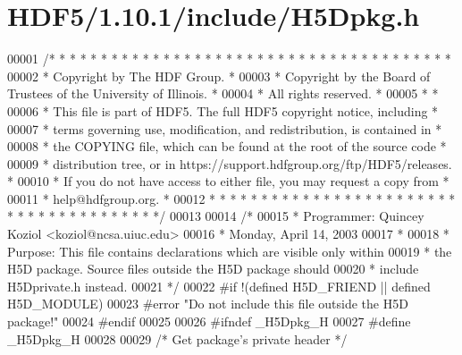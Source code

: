 \hypertarget{_h_d_f5_21_810_81_2include_2_h5_dpkg_8h_source}{}\section{H\+D\+F5/1.10.1/include/\+H5\+Dpkg.h}
\label{_h_d_f5_21_810_81_2include_2_h5_dpkg_8h_source}

\begin{DoxyCode}
00001 \textcolor{comment}{/* * * * * * * * * * * * * * * * * * * * * * * * * * * * * * * * * * * * * * *}
00002 \textcolor{comment}{ * Copyright by The HDF Group.                                               *}
00003 \textcolor{comment}{ * Copyright by the Board of Trustees of the University of Illinois.         *}
00004 \textcolor{comment}{ * All rights reserved.                                                      *}
00005 \textcolor{comment}{ *                                                                           *}
00006 \textcolor{comment}{ * This file is part of HDF5.  The full HDF5 copyright notice, including     *}
00007 \textcolor{comment}{ * terms governing use, modification, and redistribution, is contained in    *}
00008 \textcolor{comment}{ * the COPYING file, which can be found at the root of the source code       *}
00009 \textcolor{comment}{ * distribution tree, or in https://support.hdfgroup.org/ftp/HDF5/releases.  *}
00010 \textcolor{comment}{ * If you do not have access to either file, you may request a copy from     *}
00011 \textcolor{comment}{ * help@hdfgroup.org.                                                        *}
00012 \textcolor{comment}{ * * * * * * * * * * * * * * * * * * * * * * * * * * * * * * * * * * * * * * */}
00013 
00014 \textcolor{comment}{/*}
00015 \textcolor{comment}{ * Programmer:  Quincey Koziol <koziol@ncsa.uiuc.edu>}
00016 \textcolor{comment}{ *      Monday, April 14, 2003}
00017 \textcolor{comment}{ *}
00018 \textcolor{comment}{ * Purpose: This file contains declarations which are visible only within}
00019 \textcolor{comment}{ *      the H5D package.  Source files outside the H5D package should}
00020 \textcolor{comment}{ *      include H5Dprivate.h instead.}
00021 \textcolor{comment}{ */}
00022 \textcolor{preprocessor}{#if !(defined H5D\_FRIEND || defined H5D\_MODULE)}
00023 \textcolor{preprocessor}{#error "Do not include this file outside the H5D package!"}
00024 \textcolor{preprocessor}{#endif}
00025 
00026 \textcolor{preprocessor}{#ifndef \_H5Dpkg\_H}
00027 \textcolor{preprocessor}{#define \_H5Dpkg\_H}
00028 
00029 \textcolor{comment}{/* Get package's private header */}

\end{DoxyCode}
